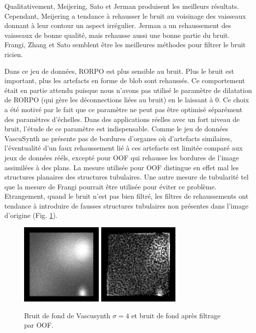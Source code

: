 Qualitativement, Meijering, Sato et Jerman produisent les meilleurs résultats. Cependant, Meijering a tendance à rehausser le bruit au voisinage des vaisseaux donnant à leur contour un aspect irrégulier. Jerman a un rehaussement des vaisseaux de bonne qualité, mais rehausse aussi une bonne partie du bruit. Frangi, Zhang et Sato semblent être les meilleures méthodes pour filtrer le bruit ricien. 

Dans ce jeu de données, RORPO est plus sensible au bruit. Plus le bruit est important, plus les artefacts en forme de blob sont rehaussés. Ce comportement était en partie attendu puisque nous n'avons pas utilisé le paramètre de dilatation de RORPO (qui gère les déconnections liées au bruit) en le laissant à 0. Ce choix a été motivé par le fait que ce paramètre ne peut pas être optimisé séparément des paramètres d'échelles. Dans des applications réelles avec un fort niveau de bruit, l'étude de ce paramètre est indispensable. 
Comme le jeu de données VascuSynth ne présente pas de bordures d'organes où d'artefacts similaires, l'éventualité d'un faux rehaussement lié à ces artefacts est limitée comparé aux jeux de données rééls, excepté pour OOF qui rehausse les bordures de l'image assimilées à des plans. La mesure utilisée pour OOF distingue en effet mal les structures planaires des structures tubulaires. Une autre mesure de tubularité tel que la mesure de Frangi pourrait être utilisée pour éviter ce problème. Etrangement, quand le bruit n'est pas bien filtré, les filtres de rehaussements ont tendance à introduire de fausses structures tubulaires non présentes dans l'image d'origine (Fig. \ref{fig:noisy_tubes}).

\begin{figure}[H]
  \centering
  \includegraphics[height=4cm]{Images/vascu_noise.png}
  \includegraphics[height=4cm]{Images/vascu_noise_OOF.png}
  \caption{Bruit de fond de Vascusynth $\sigma=4$ et bruit de fond après filtrage par OOF.}
  \label{fig:noisy_tubes}
\end{figure}

